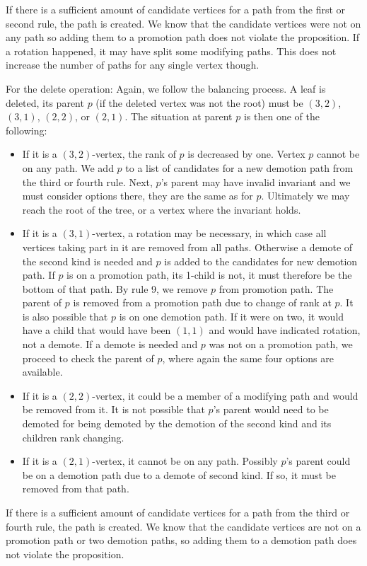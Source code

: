 \begin{myproof}
\begin{itemize}
\end{itemize}

If there is a sufficient amount of candidate vertices for a path from the first or second rule, the path is created. 
We know that the candidate vertices were not on any path so adding them to a promotion path does not violate the proposition. 
If a rotation happened, it may have split some modifying paths. 
This does not increase the number of paths for any single vertex though.

For the delete operation: Again, we follow the balancing process. 
A leaf is deleted, its parent $p$ (if the deleted vertex was not the root) must be $(3,2)$, $(3,1)$, $(2,2)$, or $(2,1)$. 
The situation at parent $p$ is then one of the following:

\begin{itemize}

\item If it is a $(3,2)$-vertex, the rank of $p$ is decreased by one. 
Vertex $p$ cannot be on any path. 
We add $p$ to a list of candidates for a new demotion path from the third or fourth rule. 
Next, $p$'s parent may have invalid invariant and we must consider options there, they are the same as for $p$. 
Ultimately we may reach the root of the tree, or a vertex where the invariant holds.

\item If it is a $(3,1)$-vertex, a rotation may be necessary, in which case all vertices taking part in it are removed from all paths.
Otherwise a demote of the second kind is needed and $p$ is added to the candidates for new demotion path.
If $p$ is on a promotion path, its 1-child is not, it must therefore be the bottom of that path. 
By rule 9, we remove $p$ from promotion path. The parent of $p$ is removed from a promotion path due to change of rank at $p$.
It is also possible that $p$ is on one demotion path. If it were on two, it would have a child that would have been $(1,1)$ and would have indicated rotation, not a demote.
If a demote is needed and $p$ was not on a promotion path, we proceed to check the parent of $p$, where again the same four options are available.

\item If it is a $(2,2)$-vertex, it could be a member of a modifying path and would be removed from it. 
It is not possible that $p$'s parent would need to be demoted for being demoted by the demotion of the second kind and its children rank changing.

\item If it is a $(2,1)$-vertex, it cannot be on any path. 
Possibly $p$'s parent could be on a demotion path due to a demote of second kind. If so, it must be removed from that path.

\end{itemize}

If there is a sufficient amount of candidate vertices for a path from the third or fourth rule, the path is created. 
We know that the candidate vertices are not on a promotion path or two demotion paths, so adding them to a demotion path does not violate the proposition.
\end{myproof}

